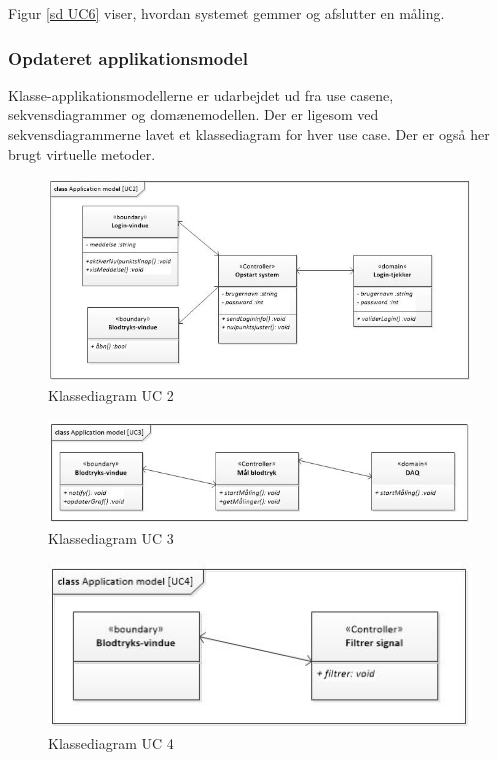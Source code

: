 Figur \ref{sd UC6} viser, hvordan systemet gemmer og afslutter en måling. 

\subsubsection{Opdateret applikationsmodel}
Klasse-applikationsmodellerne er udarbejdet ud fra use casene, sekvensdiagrammer og domænemodellen. Der er ligesom ved sekvensdiagrammerne lavet et klassediagram for hver use case. Der er også her brugt virtuelle metoder. 

\begin{figure}[H]
	\centering
	\includegraphics[width=1\textwidth]{Figurer/ISE/classAppModelUC2}
	\caption{Klassediagram UC 2}
	\label{classApp UC2}
\end{figure}

\begin{figure}[H]
	\centering
	\includegraphics[width=1\textwidth]{Figurer/ISE/classAppModelUC3}
	\caption{Klassediagram UC 3}
	\label{classApp UC3}
\end{figure}

\begin{figure}[H]
	\centering
	\includegraphics[width=1\textwidth]{Figurer/ISE/classAppModelUC4}
	\caption{Klassediagram UC 4}
	\label{classApp UC4}
\end{figure}

